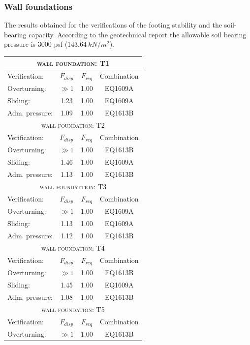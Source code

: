\subsubsection{Wall foundations}
The results obtained for the verifications of the footing stability and the soil-bearing capacity. According to the geotechnical report the allowable soil bearing pressure is 3000 psf ($143.64\ kN/m^2$).
\begin{center}
\begin{tabular}{|l|c|c|c|}
\hline
\multicolumn{4}{|c|}{\textsc{wall foundation: T1}}\\
\hline
Verification:  & $F_{disp}$ & $F_{req}$ & Combination\\
\hline
Overturning:  & $\gg 1$ & 1.00 & EQ1609A\\
Sliding:  & 1.23 & 1.00 & EQ1609A\\
Adm. pressure:  & 1.09 & 1.00 & EQ1613B\\
\hline
\multicolumn{4}{|c|}{\textsc{wall foundation: T2}}\\
\hline
Verification:  & $F_{disp}$ & $F_{req}$ & Combination\\
\hline
Overturning:  & $\gg 1$ & 1.00 & EQ1613B\\
Sliding:  & 1.46 & 1.00 & EQ1609A\\
Adm. pressure:  & 1.13 & 1.00 & EQ1613B\\
\hline
\multicolumn{4}{|c|}{\textsc{wall foundattion: T3}}\\
\hline
Verification:  & $F_{disp}$ & $F_{req}$ & Combination\\
\hline
Overturning:  & $\gg 1$ & 1.00 & EQ1609A\\
Sliding:  & 1.13 & 1.00 & EQ1609A\\
Adm. pressure:  & 1.12 & 1.00 & EQ1613B\\
\hline
\multicolumn{4}{|c|}{\textsc{wall foundation: T4}}\\
\hline
Verification:  & $F_{disp}$ & $F_{req}$ & Combination\\
\hline
Overturning:  & $\gg 1$ & 1.00 & EQ1613B\\
Sliding:  & 1.45 & 1.00 & EQ1609A\\
Adm. pressure:  & 1.08 & 1.00 & EQ1613B\\
\hline
\multicolumn{4}{|c|}{\textsc{wall foundation: T5 }}\\
\hline
Verification:  & $F_{disp}$ & $F_{req}$ & Combination\\
\hline
Overturning:  & $\gg 1$ & 1.00 & EQ1613B\\

\end{tabular}
\end{center}
